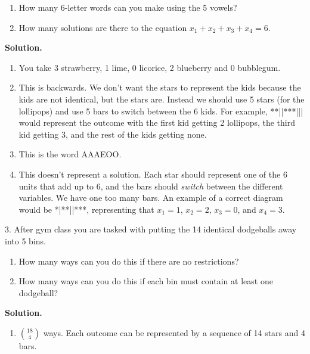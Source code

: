 \documentclass[10pt,]{book}
\theoremstyle{plain}
\theoremstyle{definition}
\theoremstyle{definition}
\theoremstyle{definition}
\numberwithin{equation}{section}
\begin{document}
\begin{exerciselist}
\begin{enumerate}[label=(\alph*)]
%
\item\hypertarget{li-578}{}
How many 6-letter words can you make using the 5 vowels?
%
\item\hypertarget{li-579}{}
How many solutions are there to the equation \(x_1 + x_2 + x_3 + x_4 = 6\).
%
\end{enumerate}
\par\smallskip
\par\smallskip
\noindent\textbf{Solution.}\hypertarget{solution-123}{}\quad
\leavevmode%
\begin{enumerate}[label=(\alph*)]
\item\hypertarget{li-580}{}
You take 3 strawberry, 1 lime, 0 licorice, 2 blueberry and 0 bubblegum.
%
\item\hypertarget{li-581}{}
This is backwards.  We don't want the stars to represent the kids because the kids are not identical, but the stars are.  Instead we should use 5 stars (for the lollipops) and use 5 bars to switch between the 6 kids.  For example, **||***||| would represent the outcome with the first kid getting 2 lollipops, the third kid getting 3, and the rest of the kids getting none.
%
\item\hypertarget{li-582}{}
This is the word AAAEOO.
%
\item\hypertarget{li-583}{}
This doesn't represent a solution.  Each star should represent one of the 6 units that add up to 6, and the bars should \emph{switch} between the different variables.  We have one too many bars.  An example of a correct diagram would be *|**||***, representing that \(x_1 = 1\), \(x_2 = 2\), \(x_3 = 0\), and   \(x_4 = 3\).
%
\end{enumerate}
\item[3.]\hypertarget{exercise-84}{}
After gym class you are tasked with putting the 14 identical dodgeballs away into 5 bins.
%
\leavevmode%
\begin{enumerate}[label=(\alph*)]
\item\hypertarget{li-584}{}
How many ways can you do this if there are no restrictions?
%
\item\hypertarget{li-585}{}
How many ways can you do this if each bin must contain at least one dodgeball?
%
\end{enumerate}
\par\smallskip
\par\smallskip
\noindent\textbf{Solution.}\hypertarget{solution-124}{}\quad
\leavevmode%
\begin{enumerate}[label=(\alph*)]
\item\hypertarget{li-586}{}\({18 \choose 4}\) ways.  Each outcome can be represented by a sequence of 14 stars and 4 bars.%

\end{enumerate}
\end{exerciselist}
\end{document}

